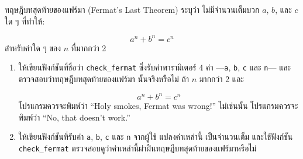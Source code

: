 \begin{exercise}

ทฤษฎีบทสุดท้ายของแฟร์มา (Fermat's Last Theorem) ระบุว่า ไม่มีจำนวนเต็มบวก
{\scriptsize$a$}, {\scriptsize$b$}, และ {\scriptsize$c$} ใด ๆ ที่ทำให้: 

\[ a^n + b^n = c^n \]
%
สำหรับค่าใด ๆ ของ {\scriptsize$n$} ที่มากกว่า 2

\begin{enumerate}

\item ให้เขียนฟังก์ชันที่ชื่อว่า \verb"check_fermat" ซึ่งรับค่าพารามิเตอร์ 4 ค่า
---{\tt a}, {\tt b}, {\tt c} และ {\tt n}--- และตรวจสอบว่าทฤษฎีบทสุดท้ายของแฟร์มา
นั้นจริงหรือไม่ ถ้า {\scriptsize$n$} มากกว่า 2 และ

\[a^n + b^n = c^n \]
%
โปรแกรมควรจะพิมพ์ว่า ``Holy smokes, Fermat was wrong!''
ไม่เช่นนั้น โปรแกรมควรจะพิมพ์ว่า ``No, that doesn't work.''

\item ให้เขียนฟังก์ชันที่รับค่า {\tt a}, {\tt b}, {\tt c} และ {\tt n} จากผู้ใช้ แปลงค่าเหล่านี้
เป็นจำนวนเต็ม และใช้ฟังก์ชัน \verb"check_fermat" 
ตรวจสอบดูว่าค่าเหล่านี้ผ่าฝืนทฤษฎีบทสุดท้ายของแฟร์มาหรือไม่

\end{enumerate}

\end{exercise}


